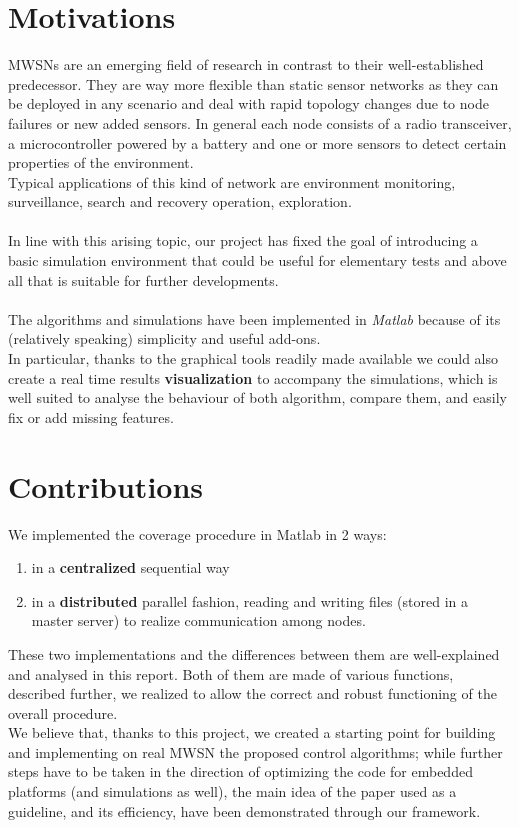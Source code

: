 \documentclass[a4paper,11pt,oneside]{book}
\begin{document}
	
	\section*{Motivations}
	MWSNs are an emerging field of research in contrast to their well-established predecessor. They are way more flexible than static sensor networks as they can be deployed in any scenario and deal with rapid topology changes due to node failures or new added sensors. In general each node consists of a radio transceiver, a microcontroller powered by a battery and one or more sensors to detect certain properties of the environment.~\cite{K2}\\ 
	Typical applications of this kind of network are environment monitoring, surveillance, search and recovery operation, exploration.\\\\
	In line with this arising topic, our project has fixed the goal of introducing a basic simulation environment that could be useful for elementary tests and above all that is suitable for further developments.\\\\
	The algorithms and simulations have been implemented in \emph{Matlab} because of its (relatively speaking) simplicity and useful add-ons.\\
	In particular, thanks to the graphical tools readily made available we could also create a real time results \textbf{visualization} to accompany the simulations, which is well suited to analyse the behaviour of both algorithm, compare them, and easily fix or add missing features.
	
	
	\section*{Contributions}
		We implemented the coverage procedure in Matlab in 2 ways:
	\begin{enumerate}
		\item in a \textbf{centralized }sequential way
		\item in a \textbf{distributed} parallel fashion, reading and writing files (stored in a master server) to realize communication among nodes.
	\end{enumerate}
	These two implementations and the differences between them are well-explained and analysed in this report. Both of them are made of various functions, described further, we realized to allow the correct and robust functioning of the overall procedure.\\
	We believe that, thanks to this project, we created a starting point for building and implementing on real MWSN the proposed control algorithms; while further steps have to be taken in the direction of optimizing the code for embedded platforms (and simulations as well), the main idea of the paper used as a guideline, and its efficiency, have been demonstrated through our framework.\\
\end{document}
